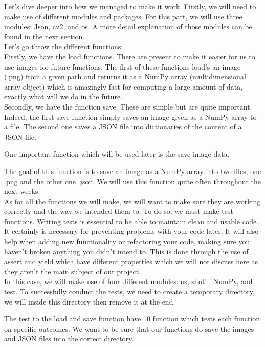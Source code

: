 \documentclass[12pt]{article}
\begin{document}
Let’s dive deeper into how we managed to make it work. Firstly, we will need to make use of different modules and packages. For this part, we will use three modules: Json, cv2, and os. A more detail explanation of those modules can be found in the next section.\\ 

 
Let’s go throw the different functions: \\ 

Firstly, we have the load functions. There are present to make it easier for us to use images for future functions. The first of these functions load’s an image (.png) from a given path and returns it as a NumPy array (multidimensional array object) which is amazingly fast for computing a large amount of data, exactly what will we do in the future.\\ 

Secondly, we have the function save. These are simple but are quite important. Indeed, the first save function simply saves an image given as a NumPy array to a file. The second one saves a JSON file into dictionaries of the content of a JSON file. 

One important function which will be used later is the save image data. 

The goal of this function is to save an image as a NumPy array into two files, one .png and the other one .json. We will use this function quite often throughout the next weeks.\\ 

As for all the functions we will make, we will want to make sure they are working correctly and the way we intended them to. To do so, we must make test functions. Writing tests is essential to be able to maintain clean and usable code. It certainly is necessary for preventing problems with your code later. It will also help when adding new functionality or refactoring your code, making sure you haven’t broken anything you didn’t intend to. This is done through the use of assert and yield which have different properties which we will not discuss here as they aren’t the main subject of our project.\\ 

In this case, we will make use of four different modules: os, shutil, NumPy, and test. To successfully conduct the tests, we need to create a temporary directory, we will inside this directory then remove it at the end.  

The test to the load and save function have 10 function which tests each function on specific outcomes. We want to be sure that our functions do save the images and JSON files into the correct directory.  
\end{document}
